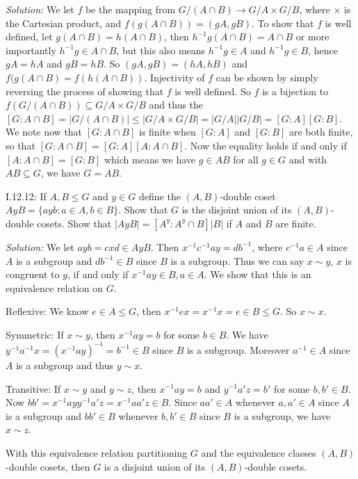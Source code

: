 \documentclass{letter}
\newcommand{\tmem}[1]{{\em #1\/}}
\begin{document}
{\tmem{Solution:}} We let $f$ be the mapping from $G / (A \cap B) \rightarrow
G / A \times G / B$, where $\times$ is the Cartesian product, and $f (g (A
\cap B)) = (g A, g B)$. To show that $f$ is well defined, let $g (A \cap B) =
h (A \cap B)$, then $h^{- 1} g (A \cap B) = A \cap B$ or more importantly
$h^{- 1} g \in A \cap B$, but this also means $h^{- 1} g \in A$ and $h^{- 1} g
\in B$, hence $g A = h A$ and $g B = h B$. So $(g A, g B) = (h A, h B)$ and $f
(g (A \cap B) = f (h (A \cap B))$. Injectivity of $f$ can be shown by simply
reversing the process of showing that $f$ is well defined. So $f$ is a
bijection to $f (G / (A \cap B)) \subseteq G / A \times G / B$ and thus the
$[G : A \cap B] = |G / (A \cap B) | \leq |G / A \times G / B| = |G / A| |G /
B| = [G : A] [G : B]$. We note now that $[G : A \cap B]$ is finite when $[G :
A]$ and $[G : B]$ are both finite, so that $[G : A \cap B] = [G : A] [A : A
\cap B]$. Now the equality holds if and only if $[A : A \cap B] = [G : B]$
which means we have $g \in A B$ for all $g \in G$ and with $A B \subseteq G$,
we have $G = A B$.

I.12.12: If $A, B \leq G$ and $y \in G$ define the $(A, B)$-double coset $A y
B =\{a y b : a \in A, b \in B\}$. Show that $G$ is the disjoint union of its
$(A, B)$-double cosets. Show that $|A y B| = [A^y : A^y \cap B] |B|$ if $A$
and $B$ are finite.

{\tmem{Solution:}} We let $a y b = c x d \in A y B$. Then $x^{- 1} c^{- 1} a y
= d b^{- 1}$, where $c^{- 1} a \in A$ since $A$ is a subgroup and $d b^{- 1}
\in B$ since $B$ is a subgroup. Thus we can say $x \sim y$, $x$ is congruent
to $y$, if and only if $x^{- 1} a y \in B, a \in A.$ We show that this is an
equivalence relation on $G$.

Reflexive: We know $e \in A \leq G$, then $x^{- 1} e x = x^{- 1} x = e \in B
\leq G$. So $x \sim x$.

Symmetric: If $x \sim y$, then $x^{- 1} a y = b$ for some $b \in B$. We have
$y^{- 1} a^{- 1} x = (x^{- 1} a y)^{- 1} = b^{- 1} \in B$ since $B$ is a
subgroup. Moreover $a^{- 1} \in A$ since $A$ is a subgroup and thus $y \sim
x$.

Transitive: If $x \sim y$ and $y \sim z$, then $x^{- 1} a y = b$ and $y^{- 1}
a' z = b'$ for some $b, b' \in B$. Now $b b' = x^{- 1} a y y^{- 1} a' z = x^{-
1} a a' z \in B$. Since $a a' \in A$ whenever $a, a' \in A$ since $A$ is a
subgroup and $b b' \in B$ whenever $b, b' \in B$ since $B$ is a subgroup, we
have $x \sim z$.

With this equivalence relation partitioning $G$ and the equivalence classes
$(A, B)$-double cosets, then $G$ is a disjoint union of its $(A, B)$-double
cosets.
\end{document}
